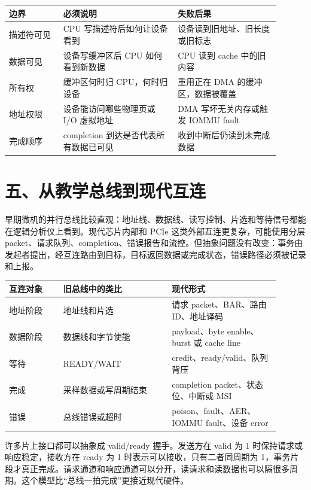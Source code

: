 \begin{longtable}{L{0.18\linewidth}L{0.38\linewidth}L{0.34\linewidth}}
\toprule
边界 & 必须说明 & 失败后果 \\
\midrule
描述符可见 & CPU 写描述符后如何让设备看到 & 设备读到旧地址、旧长度或旧标志 \\
数据可见 & 设备写缓冲区后 CPU 如何看到新数据 & CPU 读到 cache 中的旧内容 \\
所有权 & 缓冲区何时归 CPU，何时归设备 & 重用正在 DMA 的缓冲区，数据被覆盖 \\
地址权限 & 设备能访问哪些物理页或 I/O 虚拟地址 & DMA 写坏无关内存或触发 IOMMU fault \\
完成顺序 & completion 到达是否代表所有数据已可见 & 收到中断后仍读到未完成数据 \\
\bottomrule
\end{longtable}

\section{五、从教学总线到现代互连}

早期微机的并行总线比较直观：地址线、数据线、读写控制、片选和等待信号都能在逻辑分析仪上看到。现代芯片内部和 PCIe 这类外部互连更复杂，可能使用分层 packet、请求队列、completion、错误报告和流控。但抽象问题没有改变：事务由发起者提出，经互连路由到目标，目标返回数据或完成状态，错误路径必须被记录和上报。

\begin{longtable}{L{0.18\linewidth}L{0.36\linewidth}L{0.36\linewidth}}
\toprule
互连对象 & 旧总线中的类比 & 现代形式 \\
\midrule
地址阶段 & 地址线和片选 & 请求 packet、BAR、路由 ID、地址译码 \\
数据阶段 & 数据线和字节使能 & payload、byte enable、burst 或 cache line \\
等待 & READY/WAIT & credit、ready/valid、队列背压 \\
完成 & 采样数据或写周期结束 & completion packet、状态位、中断或 MSI \\
错误 & 总线错误或超时 & poison、fault、AER、IOMMU fault、设备 error \\
\bottomrule
\end{longtable}

许多片上接口都可以抽象成 valid/ready 握手。发送方在 valid 为 1 时保持请求或响应稳定，接收方在 ready 为 1 时表示可以接收，只有二者同周期为 1，事务片段才真正完成。请求通道和响应通道可以分开，读请求和读数据也可以隔很多周期。这个模型比“总线一拍完成”更接近现代硬件。

